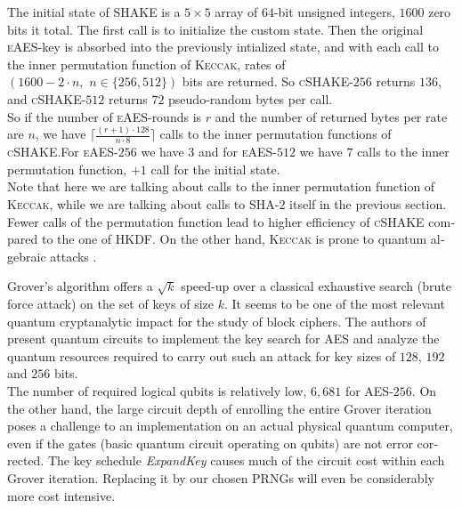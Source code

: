 \documentclass[a4paper,11pt]{article}
\begin{document}
\begin{otherlanguage}{english}
\begin{multicols}{2}
\noindent
The initial state of \textsc{SHAKE} is a $5 \times 5$ array of $64$-bit unsigned integers, $1600$ zero bits it total. The first call is to initialize the custom state. Then the original \textsc{eAES}-key is absorbed into the previously intialized state, and with each call to the inner permutation function of \textsc{Keccak}, rates of $(1600 - 2 \cdot n, \,\,  n \in \{ 256, 512 \})$ bits are returned. So \textsc{cSHAKE}-$256$ returns $136$, and \textsc{cSHAKE}-$512$ returns $72$ pseudo-random bytes per call.\\

\noindent
So if the number of \textsc{eAES}-rounds is $r$ and the number of returned bytes per rate are $n$, we have $\lceil\frac{(r+1) \cdot 128}{n \cdot 8}\rceil$ calls to the inner permutation functions of \textsc{cSHAKE}.For \textsc{eAES}-$256$ we have $3$ and for \textsc{eAES}-$512$ we have $7$ calls to the inner permutation function, $+ 1$ call for the initial state.\\

\noindent
Note that here we are talking about calls to the inner permutation function of \textsc{Keccak}, while we are talking about calls to \textsc{SHA}-$2$ itself in the previous section. Fewer calls of the permutation function lead to higher efficiency of \textsc{cSHAKE} compared to the one of \textsc{HKDF}. On the other hand, \textsc{Keccak} is prone to quantum algebraic attacks \cite{QAA}.

\vspace{0.1cm}

\noindent
Grover’s algorithm offers a $\sqrt{k}$ speed-up \cite{GRV} over a classical exhaustive search (brute force attack) on the set of keys of size $k$. It seems to be one of the most relevant quantum cryptanalytic impact for the study of block ciphers. The authors of \cite{GRO} present quantum circuits to implement the key search for \textsc{AES} and analyze the quantum resources required to carry out such an attack for key sizes of $128$, $192$ and $256$ bits. \\

\noindent
The number of required logical qubits is relatively low, $6,681$ for \textsc{AES}-$256$. On the other hand, the large circuit depth of enrolling the entire Grover iteration poses a challenge to an implementation on an actual physical quantum computer, even if the gates (basic quantum circuit operating on qubits) are not error corrected. The key schedule \textit{ExpandKey} causes much of the circuit cost within each Grover iteration. Replacing it by our chosen PRNGs will even be considerably more cost intensive. \\


\end{multicols}
\end{otherlanguage}
\end{document}
